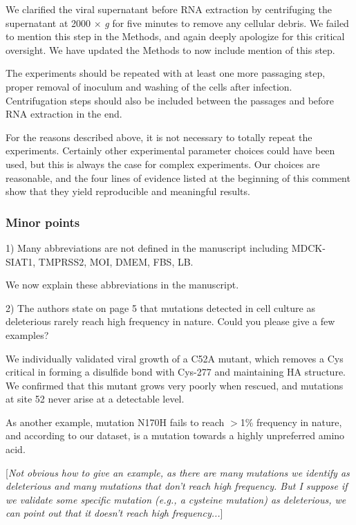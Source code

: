 \documentclass[11pt, oneside]{article}   	%
\newcommand{\comment}[1]{{\color{red}[\textsl{#1}]}}
\newcommand{\response}[1]{{\color{black}#1}}
\begin{document}
\response{We clarified the viral supernatant before RNA extraction by centrifuging the supernatant at 2000 $\times$ \textit{g} for five minutes to remove any cellular debris.
We failed to mention this step in the Methods, and again deeply apologize for this critical oversight.
We have updated the Methods to now include mention of this step.
}

The experiments should be repeated with at least one more passaging step, proper removal of inoculum and washing of the cells after infection. Centrifugation steps should also be included between the passages and before RNA extraction in the end. 

\response{For the reasons described above, it is not necessary to totally repeat the experiments.
Certainly other experimental parameter choices could have been used, but this is always the case for complex experiments.
Our choices are reasonable, and the four lines of evidence listed at the beginning of this comment show that they yield reproducible and meaningful results.}

\subsubsection*{Minor points} 

1) Many abbreviations are not defined in the manuscript including MDCK-SIAT1, TMPRSS2, MOI, DMEM, FBS, LB. 

\response{We now explain these abbreviations in the manuscript.}

2) The authors state on page 5 that mutations detected in cell culture as deleterious rarely reach high frequency in nature. Could you please give a few examples? 

\response{We individually validated viral growth of a C52A mutant, which removes a Cys critical in forming a disulfide bond with Cys-277 and maintaining HA structure.
We confirmed that this mutant grows very poorly when rescued, and mutations at site 52 never arise at a detectable level.

As another example, mutation N170H fails to reach $>$1\% frequency in nature, and according to our dataset, is a mutation towards a highly unpreferred amino acid. 
}

\comment{Not obvious how to give an example, as there are many mutations we identify as deleterious and many mutations that don't reach high frequency. 
But I suppose if we validate some specific mutation (e.g., a cysteine mutation) as deleterious, we can point out that it doesn't reach high frequency...}
\end{document}
